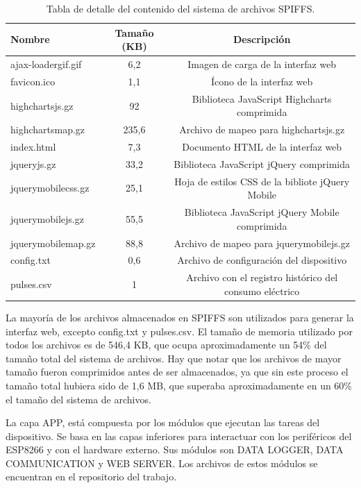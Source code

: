 \begin{table}[h]
	\centering
	\caption[Contenido SPIFFS]{Tabla de detalle del contenido del sistema de archivos SPIFFS.}
	\begin{tabular}{l c c}    
		\toprule
		\textbf{Nombre} & \textbf{Tamaño (KB)} & \textbf{Descripción} \\
		\midrule
		ajax-loadergif.gif & 6,2 & Imagen de carga de la interfaz web \\
		favicon.ico & 1,1 & Ícono de la interfaz web\\
		highchartsjs.gz	& 92 & Biblioteca JavaScript Highcharts comprimida \\
		highchartsmap.gz & 235,6 & Archivo de mapeo para highchartsjs.gz \\
		index.html & 7,3 & Documento HTML de la interfaz web \\
		jqueryjs.gz & 33,2 & Biblioteca JavaScript jQuery comprimida \\
		jquerymobilecss.gz & 25,1 & Hoja de estilos CSS de la bibliote jQuery Mobile \\
		jquerymobilejs.gz & 55,5 & Biblioteca JavaScript jQuery Mobile comprimida \\
		jquerymobilemap.gz & 88,8 & Archivo de mapeo para jquerymobilejs.gz \\
		config.txt & 0,6 & Archivo de configuración del dispositivo \\
		pulses.csv & 1 & Archivo con el registro histórico del consumo eléctrico \\
		
		\bottomrule
		\hline
	\end{tabular}
	\label{tab:spiffsDetail}
\end{table}

La mayoría de los archivos almacenados en SPIFFS son utilizados para generar la interfaz web, excepto config.txt y pulses.csv. El tamaño de memoria utilizado por todos los archivos es de 546,4 KB, que ocupa aproximadamente un 54\% del tamaño total del sistema de archivos. Hay que notar que los archivos de mayor tamaño fueron comprimidos antes de ser almacenados, ya que sin este proceso el tamaño total hubiera sido de 1,6 MB, que superaba aproximadamente en un 60\% el tamaño del sistema de archivos.

La capa APP, está compuesta por los módulos que ejecutan las tareas del dispositivo. Se basa en las capas inferiores para interactuar con los periféricos del ESP8266 y con el hardware externo. Sus módulos son DATA LOGGER, DATA COMMUNICATION y WEB SERVER. Los archivos de estos módulos se encuentran en el repositorio del trabajo.

